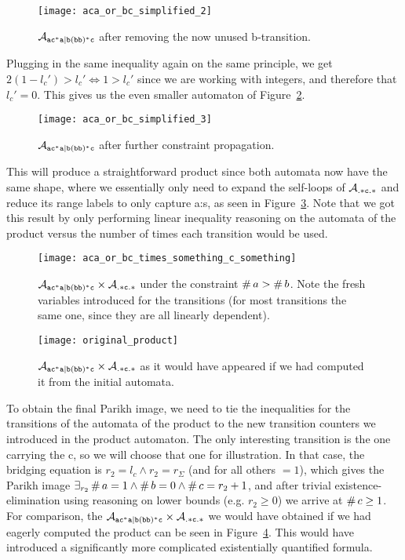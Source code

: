 \documentclass[acmsmall,review,anonymous,screen]{acmart}\settopmatter{printfolios=true,printccs=false,printacmref=true}
\theoremstyle{definition}
\begin{document}
\begin{figure}[h]
  \centering 
    \texttt{[image: aca\_or\_bc\_simplified\_2]}
    \caption{$\mathcal{A}_{\mathtt{ac^*a|b(bb)^*c}}{}$ after removing the now unused b-transition.}\label{fig:example-simplify-2}
  \end{figure}

  Plugging in the same inequality again on the same principle, we get $2(1 -
  l_c') > l_c' \iff 1 > l_c'$ since we are working with integers, and
  therefore that $l_c' = 0$. This gives us the even smaller automaton of
  Figure~\ref{fig:example-simplify-3}.

  \begin{figure}[h]
    \centering 
      \texttt{[image: aca\_or\_bc\_simplified\_3]}
      \caption{$\mathcal{A}_{\mathtt{ac^*a|b(bb)^*c}}{}$ after further constraint propagation.}\label{fig:example-simplify-3}
    \end{figure}

This will produce a straightforward product since both automata now have the
same shape, where we essentially only need to expand the self-loops of
$\mathcal{A}_{\mathtt{.*c.*}}$ and reduce its range labels to only capture a:s, as seen
in Figure~\ref{fig:final-example}. Note that we got this result by only
performing linear inequality reasoning on the automata of the product versus the
number of times each transition would be used.

\begin{figure}[h]
\centering
    \texttt{[image: aca\_or\_bc\_times\_something\_c\_something]}
    \caption{$\mathcal{A}_{\mathtt{ac^*a|b(bb)^*c}}{} \times \mathcal{A}_{\mathtt{.*c.*}}{}$ under the constraint
    $\operatorname{\#}{a} > \operatorname{\#}{b}$. Note the fresh variables
    introduced for the transitions (for most transitions the same one, since
    they are all linearly dependent).}\label{fig:final-example}
  \end{figure}


  \begin{figure}[h]
\centering
    \texttt{[image: original\_product]}
    \caption{$\mathcal{A}_{\mathtt{ac^*a|b(bb)^*c}}{} \times \mathcal{A}_{\mathtt{.*c.*}}{}$ as it would have
    appeared if we had computed it from the initial
    automata.}\label{fig:original-product}
  \end{figure}


To obtain the final Parikh image, we need to tie the inequalities for the
transitions of the automata of the product to the new transition counters we
introduced in the product automaton. The only interesting transition is the one
carrying the c, so we will choose that one for illustration. In that case, the
bridging equation is $r_2 = l_c \land r_2 = r_{\Sigma}$ (and for all others
$=1$), which gives the Parikh image $\exists_{r_2} \operatorname{\#}{a} = 1 \land
\operatorname{\#}{b} = 0 \land \operatorname{\#}{c} = r_2 + 1$, and after trivial
existence-elimination using reasoning on lower bounds (e.g. $r_2 \geq 0$) we
arrive at $\operatorname{\#}{c} \geq 1$. For comparison, the $\mathcal{A}_{\mathtt{ac^*a|b(bb)^*c}}{} \times
\mathcal{A}_{\mathtt{.*c.*}}{}$ we would have obtained if we had eagerly computed the
product can be seen in Figure~\ref{fig:original-product}. This would have
introduced a significantly more complicated existentially quantified formula.
\end{document}

